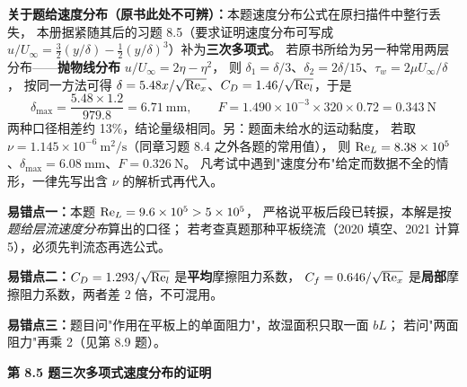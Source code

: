 \begin{tishi}
\textbf{关于题给速度分布（原书此处不可辨）：}本题速度分布公式在原扫描件中整行丢失，
本册据紧随其后的习题 8.5（要求证明速度分布可写成
$u/U_\infty=\frac32(y/\delta)-\frac12(y/\delta)^3$）补为\textbf{三次多项式}。
若原书所给为另一种常用两层分布——\textbf{抛物线分布} $u/U_\infty=2\eta-\eta^2$，
则 $\delta_1=\delta/3$、$\delta_2=2\delta/15$、$\tau_w=2\mu U_\infty/\delta$，
按同一方法可得 $\delta=5.48x/\sqrt{\mathrm{Re}_x}$、$C_D=1.46/\sqrt{\mathrm{Re}_l}$，于是
\[
\delta_{\max}=\frac{5.48\times1.2}{979.8}=6.71\ \mathrm{mm},\qquad
F=1.490\times10^{-3}\times320\times0.72=0.343\ \mathrm{N}
\]
两种口径相差约 13\%，结论量级相同。另：题面未给水的运动黏度，
若取 $\nu=1.145\times10^{-6}\ \mathrm{m^2/s}$（同章习题 8.4 之外各题的常用值），
则 $\mathrm{Re}_L=8.38\times10^5$、$\delta_{\max}=6.08\ \mathrm{mm}$、$F=0.326\ \mathrm{N}$。
凡考试中遇到"速度分布"给定而数据不全的情形，一律先写出含 $\nu$ 的解析式再代入。
\end{tishi}

\begin{yicuo}
\textbf{易错点一：}本题 $\mathrm{Re}_L=9.6\times10^5>5\times10^5$，
严格说平板后段已转捩，本解是按\emph{题给层流速度分布}算出的口径；
若考查真题那种平板绕流（2020 填空、2021 计算 5），必须先判流态再选公式。

\textbf{易错点二：}$C_D=1.293/\sqrt{\mathrm{Re}_l}$ 是\textbf{平均}摩擦阻力系数，
$C_f=0.646/\sqrt{\mathrm{Re}_x}$ 是\textbf{局部}摩擦阻力系数，两者差 2 倍，不可混用。

\textbf{易错点三：}题目问"作用在平板上的单面阻力"，故湿面积只取一面 $bL$；
若问"两面阻力"再乘 2（见第 8.9 题）。
\end{yicuo}

\noindent\textbf{第 8.5 题\quad 三次多项式速度分布的证明}

